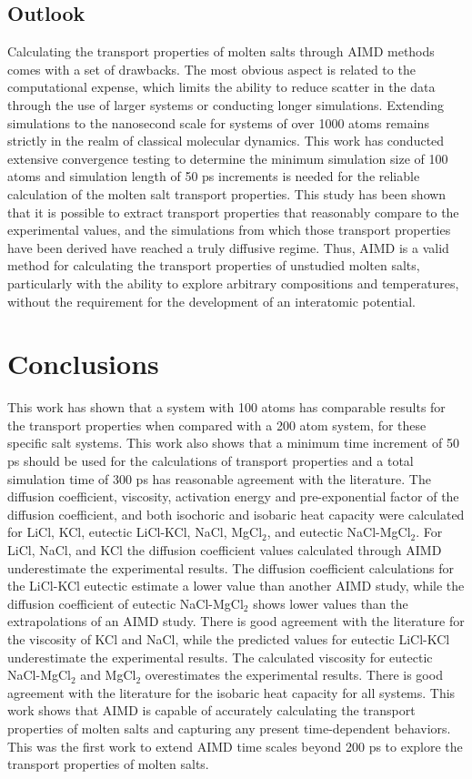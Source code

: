 \documentclass[review]{elsarticle}
\begin{document}
\subsection{Outlook}
Calculating the transport properties of molten salts through AIMD methods comes with a set of drawbacks. The most obvious aspect is related to the computational expense, which limits the ability to reduce scatter in the data through the use of larger systems or conducting longer simulations. Extending simulations to the nanosecond scale for systems of over 1000 atoms remains strictly in the realm of classical molecular dynamics. This work has conducted extensive convergence testing to determine the minimum simulation size of 100 atoms and simulation length of 50 ps increments is needed for the reliable calculation of the molten salt transport properties. This study has been shown that it is possible to extract transport properties that reasonably compare to the experimental values, and the simulations from which those transport properties have been derived have reached a truly diffusive regime. Thus, AIMD is a valid method for calculating the transport properties of unstudied molten salts, particularly with the ability to explore arbitrary compositions and temperatures, without the requirement for the development of an interatomic potential. 

\FloatBarrier
\section{Conclusions}
This work has shown that a system with 100 atoms has comparable results for the transport properties when compared with a 200 atom system, for these specific salt systems. This work also shows that a minimum time increment of 50 ps should be used for the calculations of transport properties and a total simulation time of 300 ps has reasonable agreement with the literature. The diffusion coefficient, viscosity, activation energy and pre-exponential factor of the diffusion coefficient, and both isochoric and isobaric heat capacity were calculated for LiCl, KCl, eutectic LiCl-KCl, NaCl, MgCl$_2$, and eutectic NaCl-MgCl$_2$. For LiCl, NaCl, and KCl the diffusion coefficient values calculated through AIMD underestimate the experimental results. The diffusion coefficient calculations for the LiCl-KCl eutectic estimate a lower value than another AIMD study, while the diffusion coefficient of eutectic NaCl-MgCl$_2$ shows lower values than the extrapolations of an AIMD study. There is good agreement with the literature for the viscosity of KCl and NaCl, while the predicted values for eutectic LiCl-KCl underestimate the experimental results. The calculated viscosity for eutectic NaCl-MgCl$_2$ and MgCl$_2$ overestimates the experimental results. There is good agreement with the literature for the isobaric heat capacity for all systems. This work shows that AIMD is capable of accurately calculating the transport properties of molten salts and capturing any present time-dependent behaviors. This was the first work to extend AIMD time scales beyond 200 ps to explore the transport properties of molten salts.
\end{document}
